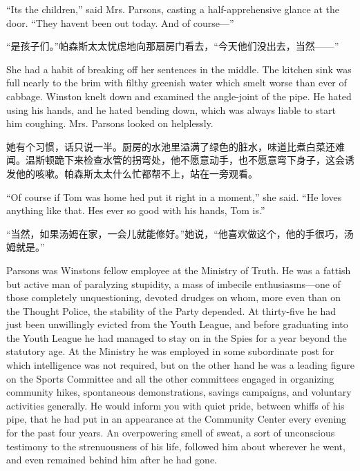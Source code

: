 \begin{paracol}{2}
\switchcolumn*

``It\textquotesingle s the children,'' said Mrs. Parsons, casting a
half-apprehensive glance at the door. ``They haven\textquotesingle t been
out today. And of course---''

\switchcolumn

``是孩子们。''帕森斯太太忧虑地向那扇房门看去，``今天他们没出去，当然——''

\switchcolumn*

She had a habit of breaking off her sentences in the middle. The kitchen
sink was full nearly to the brim with filthy greenish water which smelt
worse than ever of cabbage. Winston knelt down and examined the
angle-joint of the pipe. He hated using his hands, and he hated bending
down, which was always liable to start him coughing. Mrs. Parsons looked
on helplessly.

\switchcolumn

她有个习惯，话只说一半。厨房的水池里溢满了绿色的脏水，味道比煮白菜还难闻。温斯顿跪下来检查水管的拐弯处，他不愿意动手，也不愿意弯下身子，这会诱发他的咳嗽。帕森斯太太什么忙都帮不上，站在一旁观看。

\switchcolumn*

``Of course if Tom was home he\textquotesingle d put it right in a
moment,'' she said. ``He loves anything like that. He\textquotesingle s
ever so good with his hands, Tom is.''

\switchcolumn

``当然，如果汤姆在家，一会儿就能修好。''她说，``他喜欢做这个，他的手很巧，汤姆就是。''

\switchcolumn*

Parsons was Winston\textquotesingle s fellow employee at the Ministry of
Truth. He was a fattish but active man of paralyzing stupidity, a mass
of imbecile enthusiasms---one of those completely unquestioning, devoted
drudges on whom, more even than on the Thought Police, the stability of
the Party depended. At thirty-five he had just been unwillingly evicted
from the Youth League, and before graduating into the Youth League he
had managed to stay on in the Spies for a year beyond the statutory age.
At the Ministry he was employed in some subordinate post for which
intelligence was not required, but on the other hand he was a leading
figure on the Sports Committee and all the other committees engaged in
organizing community hikes, spontaneous demonstrations, savings
campaigns, and voluntary activities generally. He would inform you with
quiet pride, between whiffs of his pipe, that he had put in an
appearance at the Community Center every evening for the past four
years. An overpowering smell of sweat, a sort of unconscious testimony
to the strenuousness of his life, followed him about wherever he went,
and even remained behind him after he had gone.


\end{paracol}
